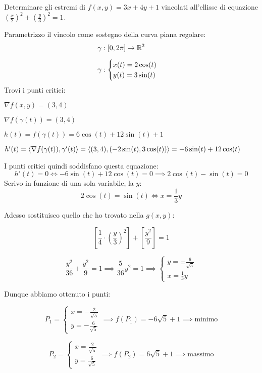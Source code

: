 Determinare gli estremi di \(f(x,y) = 3x + 4y +1\) vincolati all'ellisse di equazione \({\left(\frac{x}{2}\right)}^{2}+ {\left(\frac{y}{3}\right)}^{2}=1\).

Parametrizzo il vincolo come sostegno della curva piana regolare:
\begin{align*}
     & \gamma: [0,2\pi] \to \mathbb{R}^2 \\[2mm]
     & \gamma: \begin{cases}
                   x(t) = 2 \cos(t) \\
                   y(t) = 3 \sin(t)
               \end{cases}
\end{align*}
Trovi i punti critici:

\vspace{3mm}
\(\nabla f(x,y) = (3,4)\)

\(\nabla f(\gamma(t)) = (3,4)\)

\(h(t) = f(\gamma(t)) = 6 \cos(t) + 12 \sin(t) + 1\)

\(h'(t) = \langle\nabla f(\gamma(t)),\gamma'(t)\rangle = \langle(3,4),(-2\sin(t),3\cos(t))\rangle = -6 \sin(t) + 12 \cos(t)\)
\vspace{3mm}

I punti critici quindi soddisfano questa equazione:
\[
    h'(t) = 0 \iff -6 \sin(t) + 12 \cos(t) = 0 \implies 2 \cos(t) - \sin(t) = 0
\]
Scrivo in funzione di una sola variabile, la \(y\):
\[
    2 \cos(t) = \sin(t) \iff x = \frac{1}{3}y
\]

Adesso sostituisco quello che ho trovato nella \(g(x,y)\):

\[
    \left[ \frac{1}{4} \cdot {\left(\frac{y}{3}\right)}^{2} \right] + \left[ \frac{y^{2}}{9} \right] = 1
\]

\[
    \frac{y^{2}}{36} + \frac{y^{2}}{9} = 1
    \implies
    \frac{5}{36} y^{2} = 1
    \implies
    \begin{cases*}
        y = \pm \frac{6}{\sqrt{5}} \\
        x = \frac{1}{3}y
    \end{cases*}
\]

Dunque abbiamo ottenuto i punti:

\[
    P_1=\begin{cases}
        x= - \frac{2}{\sqrt{5}} \\
        y = -\frac{6}{\sqrt{5}}
    \end{cases}
    \implies
    f(P_1) = -6 \sqrt{5} + 1
    \implies
    \text{minimo}
\]

\[
    P_2=\begin{cases}
        x=  \frac{2}{\sqrt{5}} \\
        y = \frac{6}{\sqrt{5}}
    \end{cases}
    \implies
    f(P_2) = 6 \sqrt{5} + 1
    \implies
    \text{massimo}
\]


